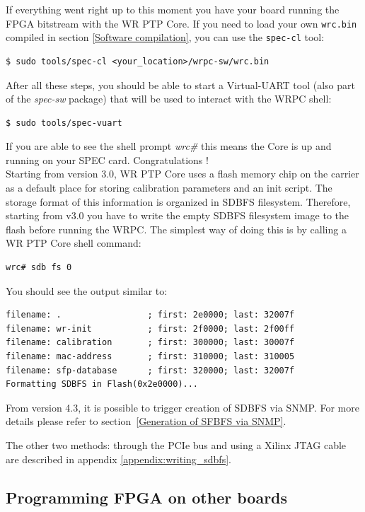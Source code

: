 \documentclass[a4paper, 12pt]{article}
\renewcommand{\_}{\underscore\allowbreak}
\begin{document}
If everything went right up to this moment you have your board running the FPGA
bitstream with the WR PTP Core. If you need to load your own \texttt{wrc.bin}
compiled in section \ref{Software compilation}, you can use the
\texttt{spec-cl} tool:
\begin{lstlisting}
$ sudo tools/spec-cl <your_location>/wrpc-sw/wrc.bin
\end{lstlisting}

After all these steps, you should be able to start a Virtual-UART tool (also
part of the \textit{spec-sw} package) that will be used to interact with the
WRPC shell:
\begin{lstlisting}
$ sudo tools/spec-vuart
\end{lstlisting}
If you are able to see the shell prompt \textit{wrc\#} this means the Core
is up and running on your SPEC card. Congratulations !\\

Starting from version 3.0, WR PTP Core uses a flash memory chip on the carrier
as a default place for storing calibration parameters and an init script.
The storage format of this information is organized in SDBFS filesystem.
Therefore, starting from v3.0 you have to write the empty
SDBFS filesystem image to the flash before running the WRPC. The simplest way of
doing this is by calling a WR PTP Core shell command:
\begin{lstlisting}
wrc# sdb fs 0
\end{lstlisting}
You should see the output similar to:
\begin{lstlisting}[basicstyle=\scriptsize\ttfamily]
filename: .                 ; first: 2e0000; last: 32007f
filename: wr-init           ; first: 2f0000; last: 2f00ff
filename: calibration       ; first: 300000; last: 30007f
filename: mac-address       ; first: 310000; last: 310005
filename: sfp-database      ; first: 320000; last: 32007f
Formatting SDBFS in Flash(0x2e0000)...
\end{lstlisting}
From version 4.3, it is possible to trigger creation of SDBFS via SNMP.
For more details please refer to section~\ref{Generation of SFBFS via SNMP}.

The other two methods: through the PCIe bus and using a Xilinx JTAG cable are
described in appendix \ref{appendix:writing_sdbfs}.


\subsection{Programming FPGA on other boards}
\end{document}
